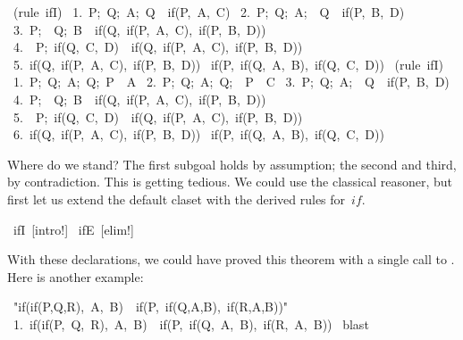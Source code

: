 \begin{isabelle}
\ (rule\ ifI)\isanewline
\ 1.\ \isasymlbrakk P;\ Q;\ A;\ Q\isasymrbrakk \ \isasymLongrightarrow \ if(P,\ A,\ C)\isanewline
\ 2.\ \isasymlbrakk P;\ Q;\ A;\ \isasymnot \ Q\isasymrbrakk \ \isasymLongrightarrow \ if(P,\ B,\ D)\isanewline
\ 3.\ \isasymlbrakk P;\ \isasymnot \ Q;\ B\isasymrbrakk \ \isasymLongrightarrow \ if(Q,\ if(P,\ A,\ C),\ if(P,\ B,\ D))\isanewline
\ 4.\ \isasymlbrakk \isasymnot \ P;\ if(Q,\ C,\ D)\isasymrbrakk \ \isasymLongrightarrow \ if(Q,\ if(P,\ A,\ C),\ if(P,\ B,\ D))\isanewline
\ 5.\ if(Q,\ if(P,\ A,\ C),\ if(P,\ B,\ D))\ \isasymLongrightarrow \isanewline
{}if(P,\ if(Q,\ A,\ B),\ if(Q,\ C,\ D))
\isanewline
{}\ (rule\ ifI)\isanewline
\ 1.\ \isasymlbrakk P;\ Q;\ A;\ Q;\ P\isasymrbrakk \ \isasymLongrightarrow \ A\isanewline
\ 2.\ \isasymlbrakk P;\ Q;\ A;\ Q;\ \isasymnot \ P\isasymrbrakk \ \isasymLongrightarrow \ C\isanewline
\ 3.\ \isasymlbrakk P;\ Q;\ A;\ \isasymnot \ Q\isasymrbrakk \ \isasymLongrightarrow \ if(P,\ B,\ D)\isanewline
\ 4.\ \isasymlbrakk P;\ \isasymnot \ Q;\ B\isasymrbrakk \ \isasymLongrightarrow \ if(Q,\ if(P,\ A,\ C),\ if(P,\ B,\ D))\isanewline
\ 5.\ \isasymlbrakk \isasymnot \ P;\ if(Q,\ C,\ D)\isasymrbrakk \ \isasymLongrightarrow \ if(Q,\ if(P,\ A,\ C),\ if(P,\ B,\ D))\isanewline
\ 6.\ if(Q,\ if(P,\ A,\ C),\ if(P,\ B,\ D))\ \isasymLongrightarrow \isanewline
{}if(P,\ if(Q,\ A,\ B),\ if(Q,\ C,\ D))
\end{isabelle}
Where do we stand?  The first subgoal holds by assumption; the second and
third, by contradiction.  This is getting tedious.  We could use the classical
reasoner, but first let us extend the default claset with the derived rules
for~$if$.
\begin{isabelle}
\ ifI\ [intro!]\isanewline
{}\ ifE\ [elim!]
\end{isabelle}
With these declarations, we could have proved this theorem with a single
call to .  Here is another example:
\begin{isabelle}
\ "if(if(P,Q,R),\ A,\ B)\ <->\ if(P,\ if(Q,A,B),\ if(R,A,B))"\isanewline
\ 1.\ if(if(P,\ Q,\ R),\ A,\ B)\ \isasymlongleftrightarrow \ if(P,\ if(Q,\ A,\ B),\ if(R,\ A,\ B))
\isanewline
{}\ blast
\end{isabelle}


